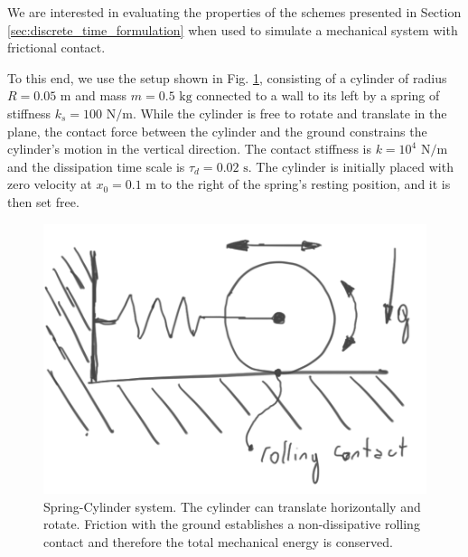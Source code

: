 We are interested in evaluating the properties of the schemes presented in
Section \ref{sec:discrete_time_formulation} when used to simulate a mechanical
system with frictional contact.

To this end, we use the setup shown in Fig. \ref{fig:spring_cylinder}, consisting
of a cylinder of radius $R=0.05\text{ m}$ and mass $m=0.5\text{ kg}$ connected
to a wall to its left by a spring of stiffness $k_s=100\text{ N}/\text{m}$.
While the cylinder is free to rotate and translate in the plane, the contact
force between the cylinder and the ground constrains the cylinder's motion in
the vertical direction. The contact stiffness is $k=10^{4}\text{ N}/\text{m}$
and the dissipation time scale is $\tau_d=0.02\text{ s}$. The cylinder is
initially placed with zero velocity at $x_0=0.1\text{ m}$ to the right of the
spring's resting position, and it is then set free.
\begin{figure}[!h]
	\centering
	\includegraphics[width=0.6\columnwidth]{figures/spring_cylinder/hand_drawn_schematic.png}
	\caption{\label{fig:spring_cylinder} 
	Spring-Cylinder system. The cylinder can translate horizontally and rotate.
	Friction with the ground establishes a non-dissipative rolling contact and
	therefore the total mechanical energy is conserved.}
\end{figure}

